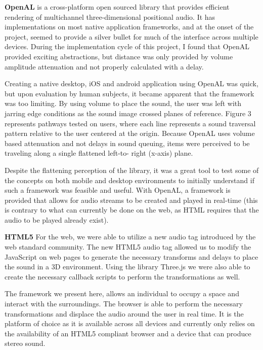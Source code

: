 \textbf{OpenAL} is a cross-platform open sourced library that provides
efficient rendering of multichannel three-dimensional positional audio.  It has
implementations on most native  application frameworks, and at the onset of the
project, seemed to provide a silver bullet for much of the interface across
multiple devices.  During the implementation cycle of this project, I found
that OpenAL provided exciting abstractions, but distance was only provided by
volume amplitude attenuation and not properly calculated with a delay.

Creating a native desktop, iOS and android application using OpenAL was quick,
but upon evaluation by  human subjects, it became apparent that the framework
was too limiting.  By using volume to place the sound, the user was left with
jarring edge conditions as the sound image crossed planes of reference.
Figure 3 represents pathways tested on users, where each line
represents a sound traversal pattern relative to the user centered at the
origin. Because OpenAL uses volume based attenuation and not delays in sound
queuing, items were perceived to be traveling along a single flattened left-to-
right (x-axis) plane.

Despite the flattening perception of the library, it was a great tool to test
some of the concepts on both mobile and desktop environments to initially
understand if such a framework was feasible and useful.  With OpenAL, a
framework is provided that allows for audio streams to be created and played in
real-time (this is contrary to what can currently be done on the web, as HTML
requires that the audio to be played already exist).

\textbf{HTML5} For the web, we were able to utilize a new audio tag introduced
by the web standard community.  The new HTML5 audio tag allowed us to modify the
JavaScript on web pages to generate the necessary transforms and delays to
place the sound in a 3D environment.  Using the library Three.js we were also
able to create the necessary callback scripts to perform the transformations as
well.

The framework we present here, allows an individual to occupy a space and
interact with the surroundings.  The browser is able to perform the necessary
transformations and displace the audio around the user in real time. It is the
platform of choice as it is available across all devices and currently only
relies on the availability of an HTML5 compliant browser and a device that
can produce stereo sound.
